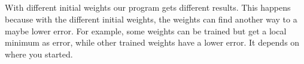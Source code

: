 \documentclass{scrartcl}
\begin{document}
  \subsection{}
  With different initial weights our program gets different results. This happens because with the different initial weights, the weights can find another way to a maybe lower error. For example, some weights can be trained but get a local minimum as error, while other trained weights have a lower error. It depends on where you started.
  
  
\end{document}
